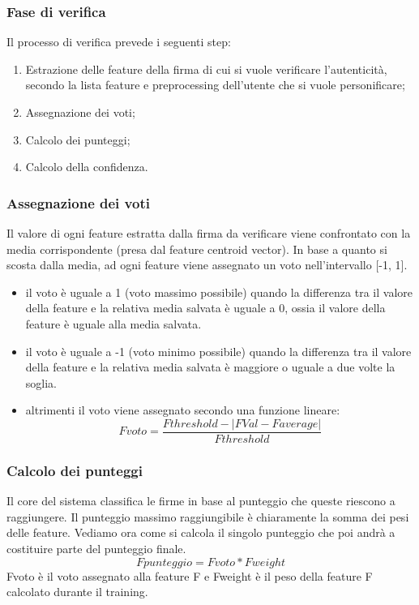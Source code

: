\subsubsection*{Fase di verifica}
\label{2.1.4.2}
Il processo di verifica prevede i seguenti step:
\begin{enumerate}
\item Estrazione delle feature della firma di cui si vuole verificare l’autenticità, secondo la lista feature e preprocessing dell’utente che si vuole personificare;
\item Assegnazione dei voti;
\item Calcolo dei punteggi;
\item Calcolo della confidenza.
\end{enumerate}
\subsubsection*{Assegnazione dei voti}
\label{2.1.4.3}
Il valore di ogni feature estratta dalla firma da verificare viene confrontato con la media corrispondente (presa dal feature centroid vector). In base a quanto si scosta dalla media, ad ogni feature viene assegnato un voto nell'intervallo [-1, 1].
\begin{itemize}
\item il voto è uguale a 1 (voto massimo possibile) quando la differenza tra il valore della feature e la relativa media salvata è uguale a 0, ossia il valore della feature è uguale alla media salvata.
\item il voto è uguale a -1 (voto minimo possibile) quando la differenza tra il valore della feature e la relativa media salvata è maggiore o uguale a due volte la soglia.
\item altrimenti il voto viene assegnato secondo una funzione lineare:
\[Fvoto=\frac{Fthreshold-|FVal-Faverage|}{Fthreshold}\]
\end{itemize}
\subsubsection*{Calcolo dei punteggi}
\label{2.1.4.4}
Il core del sistema classifica le firme in base al punteggio che queste riescono a raggiungere. Il punteggio massimo raggiungibile è chiaramente la somma dei pesi delle feature. Vediamo ora come si calcola il singolo punteggio che poi andrà a costituire parte del punteggio finale.
\[Fpunteggio=Fvoto * Fweight\]
Fvoto è il voto assegnato alla feature F e Fweight è il peso della feature F calcolato durante il training.
